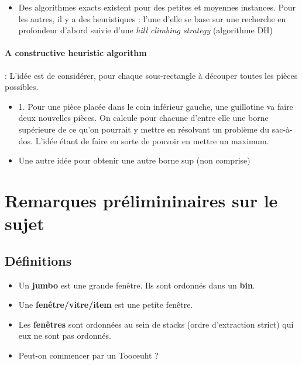 \documentclass{article}
\begin{document}
    \begin{itemize}
        \item Des algorithmes exacts existent pour des petites et moyennes instances. Pour les autres, il y a des heuristiques : l'une d'elle se base sur une recherche en profondeur d'abord suivie d'une \textit{hill climbing strategy} (algorithme DH)
    \end{itemize}

    \paragraph{A constructive heuristic algorithm} : L'idée est de considérer, pour chaque sous-rectangle à découper toutes les pièces possibles.
    \begin{itemize}
        \item 1. Pour une pièce placée dans le coin inférieur gauche, une guillotine va faire deux nouvelles pièces. On calcule pour chacune d'entre elle une borne supérieure de ce qu'on pourrait y mettre en résolvant un problème du sac-à-dos. L'idée étant de faire en sorte de pouvoir en mettre un maximum.
        \item Une autre idée pour obtenir une autre borne sup (non comprise)
    \end{itemize}

\section{Remarques prélimininaires sur le sujet}
    \subsection{Définitions}
        \begin{itemize}
            \item Un \textbf{jumbo} est une grande fenêtre. Ils sont ordonnés dans un \textbf{bin}.
            \item Une \textbf{fenêtre/vitre/item} est une petite fenêtre.
            \item Les \textbf{fenêtres} sont ordonnées au sein de stacks (ordre d'extraction strict) qui eux ne sont pas ordonnés.
            \item Peut-on commencer par un Tooceuht ?
        \end{itemize}





\end{document}
